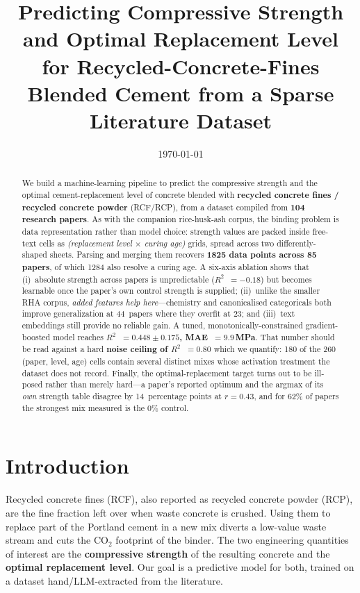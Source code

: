 \documentclass[11pt]{article}
\title{\textbf{Predicting Compressive Strength and Optimal Replacement Level\\
for Recycled-Concrete-Fines Blended Cement from a Sparse Literature Dataset}}
\date{\today}
\newcommand{\R}{$R^2$}
\begin{document}
\maketitle

\begin{abstract}
\noindent
We build a machine-learning pipeline to predict the compressive strength and the
optimal cement-replacement level of concrete blended with \textbf{recycled concrete
fines / recycled concrete powder} (RCF/RCP), from a dataset compiled from
\textbf{104 research papers}. As with the companion rice-husk-ash corpus, the
binding problem is data representation rather than model choice: strength values are
packed inside free-text cells as \emph{(replacement level $\times$ curing age)}
grids, spread across two differently-shaped sheets. Parsing and merging them
recovers \textbf{1825 data points across 85 papers}, of which 1284 also resolve a
curing age. A six-axis ablation shows that (i)~absolute strength across papers is
unpredictable (\R{}~$=-0.18$) but becomes learnable once the paper's own control
strength is supplied; (ii)~unlike the smaller RHA corpus, \emph{added features help
here}---chemistry and canonicalised categoricals both improve generalization at
44~papers where they overfit at 23; and (iii)~text embeddings still provide no
reliable gain. A tuned, monotonically-constrained gradient-boosted model reaches
\textbf{\R{}~$=0.448\pm0.175$, MAE~$=9.9$\,MPa}. That number should be read against
a hard \textbf{noise ceiling of \R{}~$=0.80$} which we quantify: 180 of the 260
(paper, level, age) cells contain several distinct mixes whose activation treatment
the dataset does not record. Finally, the optimal-replacement target turns out to be
ill-posed rather than merely hard---a paper's reported optimum and the argmax of its
\emph{own} strength table disagree by 14~percentage points at $r=0.43$, and for 62\%
of papers the strongest mix measured is the 0\% control.
\end{abstract}

\section{Introduction}
Recycled concrete fines (RCF), also reported as recycled concrete powder (RCP), are
the fine fraction left over when waste concrete is crushed. Using them to replace
part of the Portland cement in a new mix diverts a low-value waste stream and cuts
the $\mathrm{CO_2}$ footprint of the binder. The two engineering quantities of
interest are the \textbf{compressive strength} of the resulting concrete and the
\textbf{optimal replacement level}. Our goal is a predictive model for both, trained
on a dataset hand/LLM-extracted from the literature.
\end{document}
